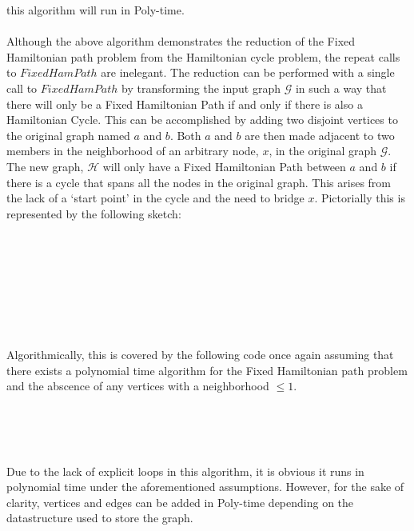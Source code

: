 \documentclass[12pt]{article}
\begin{document}
this algorithm will run in Poly-time.\\\\
Although the above algorithm demonstrates the reduction of the
Fixed Hamiltonian path problem from the Hamiltonian cycle problem, the
repeat calls to $FixedHamPath$ are inelegant. The reduction can be 
performed with a single call to $FixedHamPath$ by transforming the
input graph $\mathcal{G}$ in such a way that there will only be a
Fixed Hamiltonian Path if and only if there is also a Hamiltonian 
Cycle.  This can be accomplished by adding two disjoint vertices
to the original graph named $a$ and $b$.  Both $a$ and $b$ are then
made adjacent to two members in the neighborhood of an arbitrary node, $x$,
in the original graph $\mathcal{G}$.  The new graph, $\mathcal{H}$
will only have a Fixed Hamiltonian Path between $a$ and $b$
if there is a cycle that spans all the nodes in
the original graph.  This arises from the lack of a `start point' in
the cycle and the need to bridge $x$.
Pictorially this is represented by the following
sketch:\\\\\\\\\\\\\\\\\\   

Algorithmically, this is covered by the following code once again
assuming that there exists a polynomial time algorithm for the
Fixed Hamiltonian path problem and the abscence of any vertices with
a neighborhood $\leq 1$.\\\\ 
\begin{algorithm}[H]
\\
\\
\end{algorithm}
Due to the lack of explicit loops in this algorithm, it is obvious it
runs in polynomial time under the aforementioned assumptions.  However,
for the sake of clarity, vertices and edges can be added in Poly-time
depending on the datastructure used to store the graph.
\end{document}
